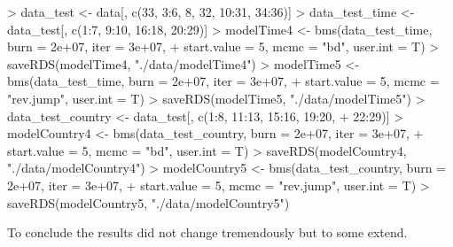 \documentclass{article}
\begin{document}
\begin{Schunk}
\begin{Sinput}
> data_test <- data[, c(33, 3:6, 8, 32, 10:31, 34:36)]
> data_test_time <- data_test[, c(1:7, 9:10, 16:18, 20:29)]
> modelTime4 <- bms(data_test_time, burn = 2e+07, iter = 3e+07, 
+     start.value = 5, mcmc = "bd", user.int = T)
> saveRDS(modelTime4, "./data/modelTime4")
> modelTime5 <- bms(data_test_time, burn = 2e+07, iter = 3e+07, 
+     start.value = 5, mcmc = "rev.jump", user.int = T)
> saveRDS(modelTime5, "./data/modelTime5")
> data_test_country <- data_test[, c(1:8, 11:13, 15:16, 19:20, 
+     22:29)]
> modelCountry4 <- bms(data_test_country, burn = 2e+07, iter = 3e+07, 
+     start.value = 5, mcmc = "bd", user.int = T)
> saveRDS(modelCountry4, "./data/modelCountry4")
> modelCountry5 <- bms(data_test_country, burn = 2e+07, iter = 3e+07, 
+     start.value = 5, mcmc = "rev.jump", user.int = T)
> saveRDS(modelCountry5, "./data/modelCountry5")
\end{Sinput}
\end{Schunk}

To conclude the results did not change tremendously but to some extend. 
\end{document}
